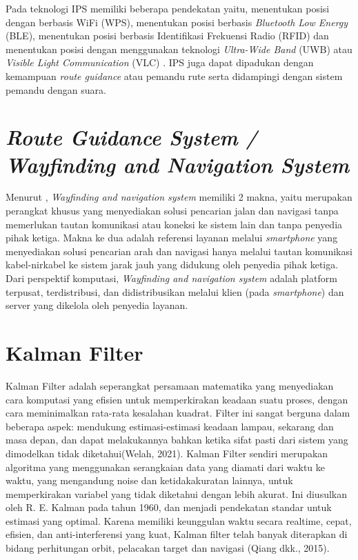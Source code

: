 \par Pada teknologi IPS memiliki beberapa pendekatan yaitu, menentukan posisi dengan berbasis WiFi (WPS), menentukan posisi berbasis \textit{Bluetooth Low Energy} (BLE), menentukan posisi berbasis Identifikasi Frekuensi Radio (RFID) dan menentukan posisi dengan menggunakan teknologi \textit{Ultra-Wide Band} (UWB) atau \textit{Visible Light Communication} (VLC) \citep{canton2017bluetooth}. IPS juga dapat dipadukan dengan kemampuan \textit{route guidance} atau pemandu rute serta didampingi dengan sistem pemandu dengan suara.


\section{\textit{Route Guidance System / Wayfinding and Navigation System}}
Menurut \citep{karimi2015indoor}, \textit{Wayfinding and navigation system} memiliki 2 makna, yaitu merupakan perangkat khusus yang menyediakan solusi pencarian jalan dan navigasi tanpa memerlukan tautan komunikasi atau koneksi ke sistem lain dan tanpa penyedia pihak ketiga. Makna ke dua adalah referensi layanan melalui \textit{smartphone} yang menyediakan solusi pencarian arah dan navigasi hanya melalui tautan komunikasi kabel-nirkabel ke sistem jarak jauh yang didukung oleh penyedia pihak ketiga. Dari perspektif komputasi, \textit{Wayfinding and navigation system} adalah platform terpusat, terdistribusi, dan didistribusikan melalui klien (pada \textit{smartphone}) dan server yang dikelola oleh penyedia layanan.

\section{Kalman Filter}
Kalman Filter adalah seperangkat persamaan matematika yang menyediakan cara komputasi yang efisien untuk memperkirakan keadaan suatu proses, dengan cara meminimalkan rata-rata kesalahan kuadrat. Filter ini sangat berguna dalam beberapa aspek: mendukung estimasi-estimasi keadaan lampau, sekarang dan masa depan, dan dapat melakukannya bahkan ketika sifat pasti dari sistem yang dimodelkan tidak diketahui(Welah, 2021). Kalman Filter sendiri merupakan algoritma yang menggunakan serangkaian data yang diamati dari waktu ke waktu, yang mengandung noise dan ketidakakuratan lainnya, untuk memperkirakan variabel yang tidak diketahui dengan lebih akurat. Ini diusulkan oleh R. E. Kalman pada tahun 1960, dan menjadi pendekatan standar untuk estimasi yang optimal. Karena memiliki keunggulan waktu secara realtime, cepat, efisien, dan anti-interferensi yang kuat, Kalman filter telah banyak diterapkan di bidang perhitungan orbit, pelacakan target dan navigasi (Qiang dkk., 2015).

